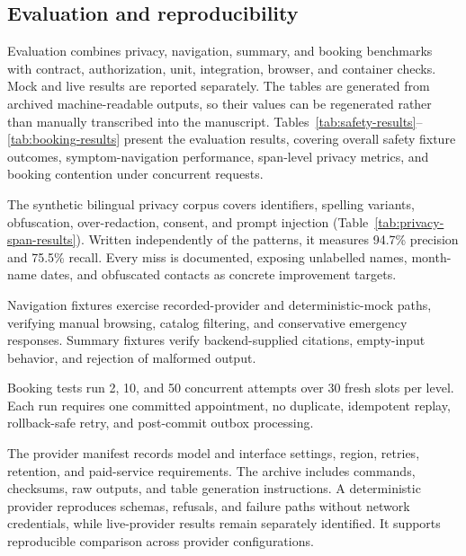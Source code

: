\documentclass[preprint,12pt,a4paper]{elsarticle}
\begin{document}

\subsection{Evaluation and reproducibility}

Evaluation combines privacy, navigation, summary, and booking benchmarks with contract,
authorization, unit, integration, browser, and container checks. Mock and live results are
reported separately. The tables are generated from archived machine-readable outputs, so
their values can be regenerated rather than manually transcribed into the manuscript. Tables~\ref{tab:safety-results}--\ref{tab:booking-results}
present the evaluation results, covering overall safety fixture outcomes,
symptom-navigation performance, span-level privacy metrics, and booking
contention under concurrent requests.

The synthetic bilingual privacy corpus covers identifiers, spelling variants, obfuscation,
over-redaction, consent, and prompt injection (Table~\ref{tab:privacy-span-results}). Written
independently of the patterns, it measures 94.7\% precision and 75.5\% recall. Every miss is
documented, exposing unlabelled names, month-name dates, and obfuscated contacts as concrete
improvement targets.

Navigation fixtures exercise recorded-provider and deterministic-mock paths, verifying
manual browsing, catalog filtering, and conservative emergency responses. Summary fixtures
verify backend-supplied citations, empty-input behavior, and rejection of malformed output.

Booking tests run 2, 10, and 50 concurrent attempts over 30 fresh slots per level. Each run
requires one committed appointment, no duplicate, idempotent replay, rollback-safe retry,
and post-commit outbox processing.

The provider manifest records model and interface settings, region, retries, retention, and
paid-service requirements. The archive includes commands, checksums, raw outputs, and table
generation instructions. A deterministic provider reproduces schemas, refusals, and failure
paths without network credentials, while live-provider results remain separately identified.
It supports reproducible comparison across provider configurations.
%

\end{document}
